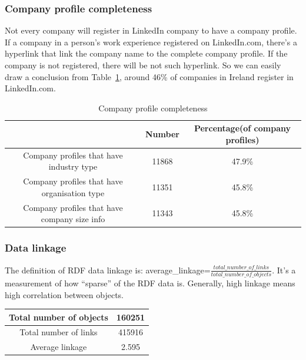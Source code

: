 \subsubsection{Company profile completeness}

Not every company will register in LinkedIn company to have a company profile. If a company in a person's work experience registered on LinkedIn.com, there's a hyperlink that link the company name to the complete company profile. If the company is not registered, there will be not such hyperlink. So we can easily draw a conclusion from Table~\ref{tab:ComPercent}, around 46\% of companies in Ireland register in LinkedIn.com.

\begin{table}[H]
    \begin{tabular}{|c|c|c|}
    \hline
    ~                                            & Number & Percentage(of company profiles) \\ \hline
    Company profiles that have industry type     & 11868  & 47.9\%                             \\ \hline
    Company profiles that have organisation type & 11351  & 45.8\%                             \\ \hline
    Company profiles that have company size info & 11343  & 45.8\%                             \\ \hline
    \end{tabular}
    \caption{Company profile completeness}
    \label{tab:ComPercent}
\end{table}

\subsubsection{Data linkage}

The definition of RDF data linkage is: average\_linkage=$\frac{total\_number\_of\_links}{total\_number\_of\_objects}$. It's a measurement of how ``sparse'' of the RDF data is. Generally, high linkage means high correlation between objects.

\begin{table}[H]
    \begin{tabular}{|c|c|}
    \hline
    Total number of objects & 160251 \\ \hline
    Total number of links   & 415916 \\ \hline
    Average linkage                 & 2.595  \\ \hline
    \end{tabular}
\end{table}

